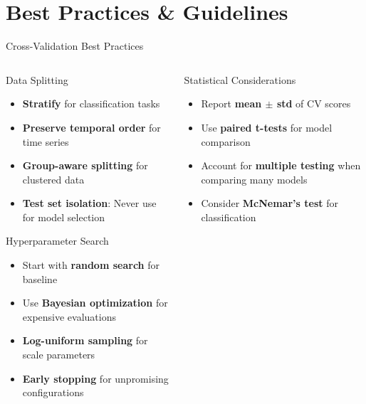 \documentclass[8pt,aspectratio=1610]{beamer}
\begin{document}

\section{Best Practices \& Guidelines}

\begin{frame}{Cross-Validation Best Practices}
\begin{columns}[t]
\begin{column}{0.48\textwidth}
\begin{block}{Data Splitting}
\begin{itemize}
\setlength{\itemsep}{3pt}
\item \textbf{Stratify} for classification tasks
\item \textbf{Preserve temporal order} for time series
\item \textbf{Group-aware splitting} for clustered data
\item \textbf{Test set isolation}: Never use for model selection
\end{itemize}
\end{block}

\begin{block}{Hyperparameter Search}
\begin{itemize}
\setlength{\itemsep}{3pt}
\item Start with \textbf{random search} for baseline
\item Use \textbf{Bayesian optimization} for expensive evaluations
\item \textbf{Log-uniform sampling} for scale parameters
\item \textbf{Early stopping} for unpromising configurations
\end{itemize}
\end{block}
\end{column}

\begin{column}{0.48\textwidth}
\begin{block}{Statistical Considerations}
\begin{itemize}
\setlength{\itemsep}{3pt}
\item Report \textbf{mean $\pm$ std} of CV scores
\item Use \textbf{paired t-tests} for model comparison
\item Account for \textbf{multiple testing} when comparing many models
\item Consider \textbf{McNemar's test} for classification
\end{itemize}
\end{block}


\end{column}
\end{columns}
\end{frame}
\end{document}
